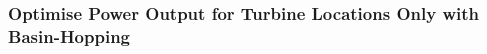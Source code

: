 \documentclass[11pt]{article}
\begin{document}
    \begin{center}
    \end{center}
    { \hspace*{\fill} \\}
    
    \begin{center}
    \end{center}
    { \hspace*{\fill} \\}
    
    \hypertarget{optimise-power-output-for-turbine-locations-only-with-basin-hopping}{%
\subsubsection{Optimise Power Output for Turbine Locations Only with
Basin-Hopping}\label{optimise-power-output-for-turbine-locations-only-with-basin-hopping}}
\end{document}
